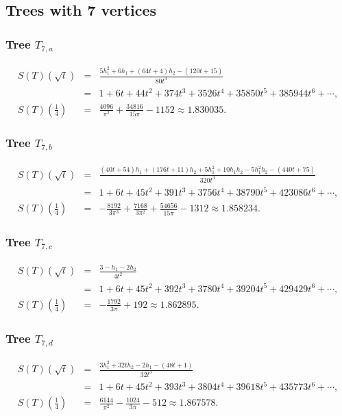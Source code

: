 \documentclass[12pt]{amsart}
\theoremstyle{plain}
\theoremstyle{remark}
\begin{document}
\medskip 

\subsection{Trees with 7 vertices}
\subsubsection{Tree $T_{7,a}$}
\begin{eqnarray*}
S(T)(\sqrt{t}) 
& = & 
\frac{5 h_1^{2} + 6 h_1 + \left(64 t +4\right) h_2 - (120 t +15) }{80 t^{3}} \\
& = & 
1+6 t +44 t^{2}+374 t^{3}+3526 t^{4}+35850 t^{5}+385944 t^{6}+\cdots, \\
S(T)\left( \frac14\right)
& = & 
\frac{4096}{\pi^{2}} +\frac{34816}{15 \pi} -1152 
\approx 
1.830035
 .
\end{eqnarray*}

\subsubsection{Tree $T_{7,b}$}
\begin{eqnarray*}
S(T)(\sqrt{t}) 
& = & 
\frac{ \left(40 t +54\right) h_1 +  \left(176 t +11\right) h_2 + 5 h_1^{2}
+10 h_1 h_2 - 5 h_1^{2} h_2-(440 t +75) }{320 t^{3}}\\
& = & 
1+6 t +45 t^{2}+391 t^{3}+3756 t^{4}+38790 t^{5}+423086 t^{6}+\cdots, \\
S(T)\left( \frac14\right)
& = & 
-\frac{8192}{3 \pi^{3}}
+\frac{7168}{3 \pi^{2}}
+\frac{54656}{15 \pi}
-1312
\approx 1.858234
 .
\end{eqnarray*}

\subsubsection{Tree $T_{7,c}$}
\begin{eqnarray*}
S(T)(\sqrt{t}) 
& = & 
\frac{3- h_1-2 h_2}{4 t^{2}}
\\
& = & 
1+6 t +45 t^{2}+392 t^{3}+3780 t^{4}+39204 t^{5}+429429 t^{6}+\cdots, \\
S(T)\left( \frac14\right)
& = & 
-\frac{1792}{3 \pi} + 192
\approx 1.862895
 .
\end{eqnarray*}

\subsubsection{Tree $T_{7,d}$}
\begin{eqnarray*}
S(T)(\sqrt{t}) 
& = & 
\frac{3 h_1^{2} + 32 t h_2 -2 h_1  - (48 t +1) }{32 t^{3}}\\
& = & 
1+6 t +45 t^{2}+393 t^{3}+3804 t^{4}+39618 t^{5}+435773 t^{6}+\cdots, \\
S(T)\left( \frac14\right)
& = & 
\frac{6144}{\pi^{2}} -\frac{1024}{3 \pi} -512
\approx 1.867578
 .
\end{eqnarray*}
\end{document}
